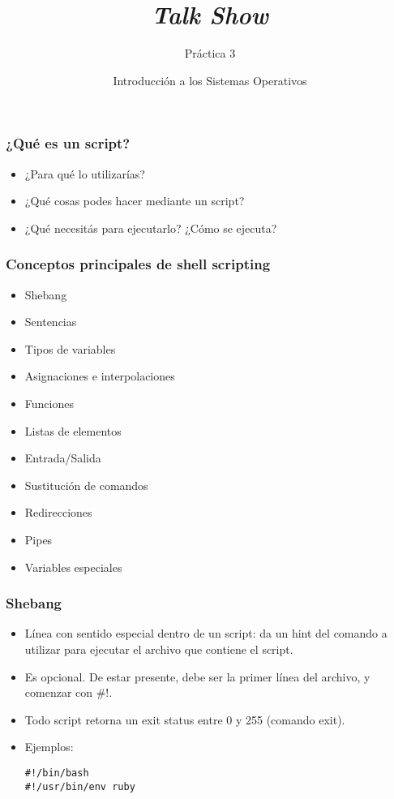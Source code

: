 


\author{Introducción a los Sistemas Operativos}



\title{\textit{Talk Show}}
\subtitle{Práctica 3}
\begin{frame}
  \titlepage
\end{frame}

\begin{frame}
  \frametitle{¿Qué es un script?}
  \begin{itemize}
	  \item ¿Para qué lo utilizarías?
	  \item ¿Qué cosas podes hacer mediante un script?
	  \item ¿Qué necesitás para ejecutarlo? ¿Cómo se ejecuta?
  \end{itemize}
\end{frame}

\begin{frame}
  \frametitle{Conceptos principales de shell scripting}
  \begin{itemize}
	  \item Shebang
    \item Sentencias
    \item Tipos de variables
    \item Asignaciones e interpolaciones
    \item Funciones
    \item Listas de elementos
    \item Entrada/Salida
    \item Sustitución de comandos
    \item Redirecciones
    \item Pipes
    \item Variables especiales
  \end{itemize}
\end{frame}

\begin{frame}[fragile]
  \frametitle{Shebang}
  \begin{itemize}
	  \item Línea con sentido especial dentro de un script: da un hint del comando a utilizar para ejecutar el archivo que contiene el script.
	  \item Es opcional. De estar presente, debe ser la primer línea del archivo, y comenzar con \#!.
	  \item Todo script retorna un exit status entre 0 y 255 (comando exit).
    \item Ejemplos:
		\begin{lstlisting}
#!/bin/bash
#!/usr/bin/env ruby
		\end{lstlisting}
  \end{itemize}
\end{frame}

